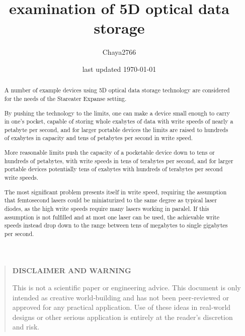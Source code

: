 \documentclass[a4paper]{article}
\title{examination of 5D optical data storage}
\author{Chaya2766}
\date{last updated \today}
\begin{document}
	\sffamily
	\sloppy
	
	\maketitle
	
	\vfill
	
	\begin{abstract}
		A number of example devices using 5D optical data storage technology are considered for the needs of the Stareater Expanse setting.
		
		\medskip
		
		By pushing the technology to the limits, one can make a device small enough to carry in one's pocket, capable of storing whole exabytes of data with write speeds of nearly a petabyte per second, and for larger portable devices the limits are raised to hundreds of exabytes in capacity and tens of petabytes per second in write speed.
		
		\medskip
		
		More reasonable limits push the capacity of a pocketable device down to tens or hundreds of petabytes, with write speeds in tens of terabytes per second, and for larger portable devices potentially tens of exabytes with hundreds of terabytes per second write speeds.
		
		\medskip
		
		The most significant problem presents itself in write speed, requiring the assumption that femtosecond lasers could be miniaturized to the same degree as typical laser diodes, as the high write speeds require many lasers working in paralel. If this assumption is not fulfilled and at most one laser can be used, the achievable write speeds instead drop down to the range between tens of megabytes to single gigabytes per second.
	\end{abstract}
	
	\vfill
	
	\begin{quote}
		\begin{center}
			\textbf{DISCLAIMER AND WARNING}
		\end{center}
		
		This is not a scientific paper or engineering advice.
		This document is only intended as creative world‑building and has not been peer‑reviewed or approved for any practical application.
		Use of these ideas in real‑world designs or other serious application is entirely at the reader’s discretion and risk.
	\end{quote}
	
\end{document}

